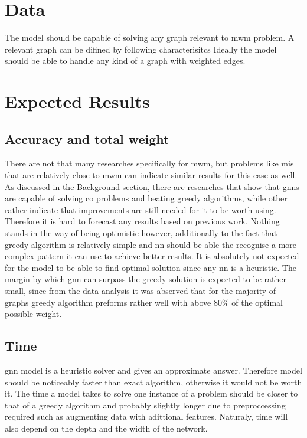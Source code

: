 \section{Data}

The model should be capable of solving any graph relevant to \gls{mwm} problem. A relevant graph can be difined by following characterisitcs
Ideally the model should be able to handle any kind of a graph with weighted edges.


\section{Expected Results}

\subsection{Accuracy and total weight}

There are not that many researches specifically for \gls{mwm}, but problems like \gls{mis} that are relatively close to \gls{mwm} can indicate similar results for this case as well. As discussed in the \hyperref[sec:background]{Background section}, there are researches that show that \gls{gnn}s are capable of solving \gls{co} problems and beating greedy algorithms, while other rather indicate that improvements are still needed for it to be worth using. Therefore it is hard to forecast any results based on previous work. Nothing stands in the way of being optimistic however, additionally to the fact that greedy algorithm is relatively simple and \gls{nn} should be able the recognise a more complex pattern it can use to achieve better results. It is absolutely not expected for the model to be able to find optimal solution since any \gls{nn} is a heuristic. The margin by which \gls{gnn} can surpass the greedy solution is expected to be rather small, since from the data analysis it was abserved that for the majority of graphs greedy algorithm preforms rather well with above 80\% of the optimal possible weight.

\subsection{Time}

\gls{gnn} model is a heuristic solver and gives an approximate answer. Therefore model should be noticeably faster than exact algorithm, otherwise it would not be worth it. The time a model takes to solve one instance of a problem should be closer to that of a greedy algorithm and probably slightly longer due to preproccessing required such as augmenting data with adittional features. Naturaly, time will also depend on the depth and the width of the network.

